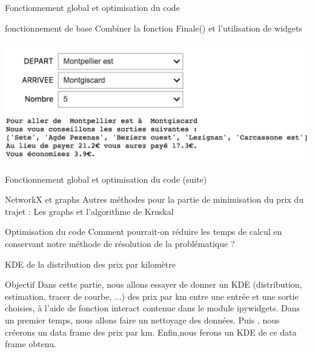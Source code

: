 \documentclass[aspectratio=169]{beamer}
\begin{document}
\begin{frame}{Fonctionnement global et optimisation du code}
    \begin{block}{fonctionnement de base}
     Combiner la fonction Finale() et l'utilisation de widgets
    \end{block}
    \begin{center}
            \includegraphics[scale=0.45]{fctFinale1.png}

    \end{center}
\end{frame}

\begin{frame}{Fonctionnement global et optimisation du code (suite)}
\begin{block}{NetworkX et graphs}
    Autres méthodes pour la partie de minimisation du prix du trajet : Les graphs et l'algorithme de Kruskal
    \end{block}
    \begin{block}{Optimisation du code}
     Comment pourrait-on réduire les temps de calcul en conservant notre méthode de résolution de la problématique ?
    \end{block}
\end{frame}


\begin{frame}{KDE de la distribution des prix par kilomètre}
\begin{block}{Objectif }
 Dans cette partie, nous allons essayer de donner un KDE (distribution, estimation, tracer de courbe, ...) des prix par km entre une entrée et une sortie choisies, à l'aide de fonction interact contenue dans le module ipywidgets. Dans un premier temps, nous allons faire un nettoyage des données. Puis , nous créerons un data frame des prix par km. Enfin,nous ferons un KDE de ce data frame obtenu.
\end{block}
    
\end{frame}
\end{document}
